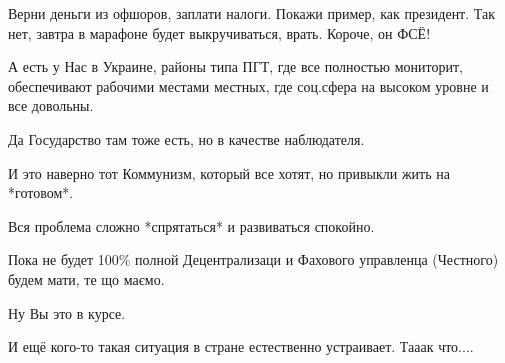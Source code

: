 \begin{itemize}
Верни деньги из офшоров, заплати налоги. Покажи пример, как президент. Так нет,
завтра в марафоне будет выкручиваться, врать. Короче, он ФСЁ!


А есть у Нас в Украине, районы типа ПГТ, где все полностью мониторит,
обеспечивают рабочими местами местных, где соц.сфера на высоком уровне и все
довольны.

Да Государство там тоже есть, но в качестве наблюдателя.

И это наверно тот Коммунизм, который все хотят, но привыкли жить на *готовом*.

Вся проблема сложно *спрятаться* и развиваться спокойно.

Пока не будет 100\% полной Децентрализаци и Фахового управленца (Честного)
будем мати, те що маємо.

Ну Вы это в курсе.

И ещё кого-то такая ситуация в стране естественно устраивает. Тааак что....


\end{itemize} %
